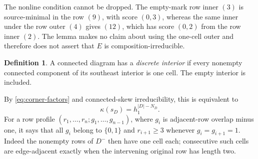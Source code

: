 \documentclass[11pt,a4paper]{amsart}
\numberwithin{equation}{section}
\theoremstyle{plain}
\theoremstyle{definition}
\newtheorem{definition}[theorem]{Definition}
\begin{document}
The nonline condition cannot be dropped.  The empty-mark row inner \((3)\) is source-minimal in the row \((9)\), with score \((0,3)\), whereas the same inner under the row outer \((4)\) gives \((12)\), which has score \((0,2)\) from the row inner \((2)\).  The lemma makes no claim about using the one-cell outer and therefore does not assert that \(E\) is composition-irreducible.

\begin{definition}\label{def:discrete-interior}
A connected diagram has a \emph{discrete interior} if every nonempty connected component of its southeast interior is one cell.  The empty interior is included.
\end{definition}
By \eqref{eq:corner-factors} and connected-skew irreducibility, this is equivalent to
\begin{equation}\label{eq:discrete-polynomial}
 \kappa(s_D)=h_1^{|D|-N_D}.
\end{equation}
For a row profile \((r_1,\ldots,r_n;g_1,\ldots,g_{n-1})\), where \(g_i\) is adjacent-row overlap minus one, it says that all \(g_i\) belong to \(\{0,1\}\) and \(r_{i+1}\ge3\) whenever \(g_i=g_{i+1}=1\).  Indeed the nonempty rows of \(D^-\) then have one cell each; consecutive such cells are edge-adjacent exactly when the intervening original row has length two.
\end{document}
